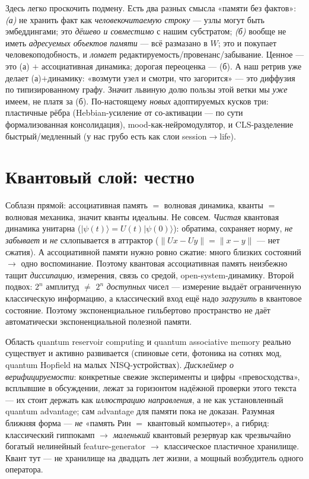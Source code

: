 \begin{principle}
Здесь легко проскочить подмену. Есть два разных смысла «памяти без фактов»:
\emph{(а)} не хранить факт как \emph{человекочитаемую строку} — узлы могут быть эмбеддингами;
это \emph{дёшево и совместимо} с нашим субстратом; \emph{(б)} вообще не иметь \emph{адресуемых
объектов памяти} — всё размазано в $W$; это и покупает человекоподобность, и \emph{ломает}
редактируемость/провенанс/забывание. Ценное — это (а) $+$ ассоциативная динамика; дорогая
переоценка — (б). А наш ретрив уже делает (а)$+$динамику: «возмути узел и смотри, что
загорится» — это диффузия по типизированному графу. Значит львиную долю пользы этой ветки мы
\emph{уже} имеем, не платя за (б). По-настоящему \emph{новых} адоптируемых кусков три:
пластичные рёбра (Hebbian-усиление от со-активации — по сути формализованная консолидация),
mood-как-нейромодулятор, и CLS-разделение быстрый/медленный (у нас грубо есть как слои
session$\to$life).
\end{principle}

\section{Квантовый слой: честно}

Соблазн прямой: ассоциативная память $=$ волновая динамика, кванты $=$ волновая механика,
значит кванты идеальны. Не совсем. \emph{Чистая} квантовая динамика унитарна
($|\psi(t)\rangle=U(t)|\psi(0)\rangle$): обратима, сохраняет норму, \emph{не забывает} и
\emph{не} схлопывается в аттрактор ($\|Ux-Uy\|=\|x-y\|$ — нет сжатия). А ассоциативной памяти
нужно ровно сжатие: много близких состояний $\to$ одно воспоминание. Поэтому квантовая
ассоциативная память неизбежно тащит \emph{диссипацию}, измерения, связь со средой,
open-system-динамику. Второй подвох: $2^n$ амплитуд $\ne$ $2^n$ \emph{доступных} чисел —
измерение выдаёт ограниченную классическую информацию, а классический вход ещё надо
\emph{загрузить} в квантовое состояние. Поэтому экспоненциальное гильбертово пространство не
даёт автоматически экспоненциальной полезной памяти.

\begin{openq}
Область quantum reservoir computing и quantum associative memory реально существует и активно
развивается (спиновые сети, фотоника на сотнях мод, quantum Hopfield на малых NISQ-устройствах).
\emph{Дисклеймер о верифицируемости}: конкретные свежие эксперименты и цифры «превосходства»,
всплывшие в обсуждении, лежат за горизонтом надёжной проверки этого текста — их стоит держать
как \emph{иллюстрацию направления}, а не как установленный quantum advantage; сам advantage для
памяти пока не доказан. Разумная ближняя форма — \emph{не} «память Рин $=$ квантовый компьютер»,
а гибрид: классический гиппокамп $\to$ \emph{маленький} квантовый резервуар как чрезвычайно
богатый нелинейный feature-generator $\to$ классическое пластичное хранилище. Квант тут — не
хранилище на двадцать лет жизни, а мощный возбудитель одного оператора.
\end{openq}

